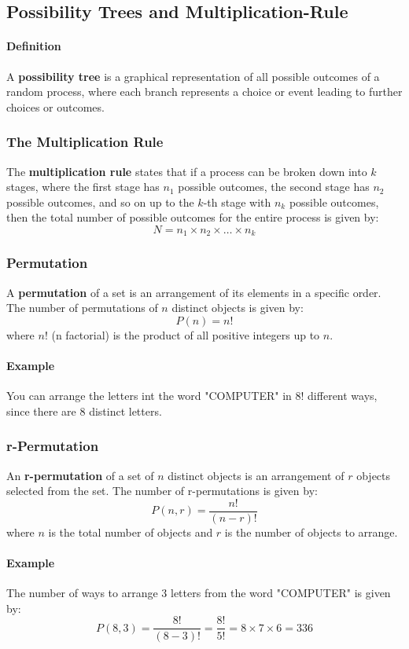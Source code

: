 \subsection{Possibility Trees and Multiplication-Rule}
\hrulefill

\paragraph*{Definition}
A \textbf{possibility tree} is a graphical representation of all possible outcomes of a random process, where each branch represents a choice or event leading to further choices or outcomes.

\subsubsection*{The Multiplication Rule}
The \textbf{multiplication rule} states that if a process can be broken down into $k$ stages, where the first stage 
has $n_1$ possible outcomes, the second stage has $n_2$ possible outcomes, and so on up to the $k$-th stage with 
$n_k$ possible outcomes, then the total number of possible outcomes for the entire process is given by:
\begin{equation*}
    N = n_1 \times n_2 \times \ldots \times n_k
\end{equation*}

\subsubsection*{Permutation}
A \textbf{permutation} of a set is an arrangement of its elements in a specific order. The number of permutations of $n$ distinct objects is given by:
\begin{equation*}
    P(n) = n!
\end{equation*}
where $n!$ (n factorial) is the product of all positive integers up to $n$.

\paragraph*{Example} You can arrange the letters int the word "COMPUTER" in $8!$ different ways, since there are 8 distinct letters.

\subsubsection*{r-Permutation}
An \textbf{r-permutation} of a set of $n$ distinct objects is an arrangement of $r$ objects selected from the set. The number of r-permutations is given by:
\begin{equation*}
    P(n, r) = \frac{n!}{(n - r)!}
\end{equation*}
where $n$ is the total number of objects and $r$ is the number of objects to arrange.

\paragraph*{Example} The number of ways to arrange 3 letters from the word "COMPUTER" is given by:
\begin{equation*}
    P(8, 3) = \frac{8!}{(8 - 3)!} = \frac{8!}{5!} = 8 \times 7 \times 6 = 336
\end{equation*}